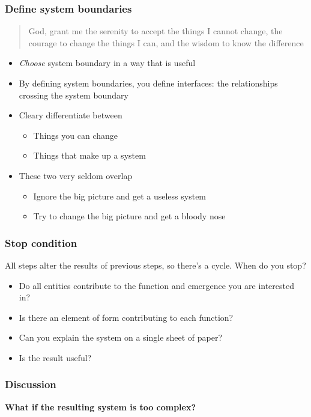 \documentclass[10pt, compress]{beamer}
\begin{document}
\begin{frame}[fragile]
	
	\frametitle{Define system boundaries}

\begin{quote}
God, grant me the serenity to accept the things I cannot change, the courage to change the things I can, and the wisdom to know the difference
\end{quote}
	
	\begin{itemize}
		\item \emph{Choose} system boundary in a way that is useful
		\item By defining system boundaries, you define interfaces: the relationships crossing the system boundary
		\item Cleary differentiate between
		\begin{itemize}
			\item Things you can change
			\item Things that make up a system
		\end{itemize}
		\item These two very seldom overlap
		\begin{itemize}
			\item Ignore the big picture and get a useless system
			\item Try to change the big picture and get a bloody nose
		\end{itemize}
		
	\end{itemize}

\end{frame}

\begin{frame}[fragile]
	\frametitle{Stop condition}
	
	All steps alter the results of previous steps, so there's a cycle. When do you stop?
	\begin{itemize}
		\item Do all entities contribute to the function and emergence you are interested in?
		\item Is there an element of form contributing to each function?
		\item Can you explain the system on a single sheet of paper?
		\item Is the result useful?
	\end{itemize}
\end{frame}

\begin{frame}[fragile]
  \frametitle{Discussion}
		\begin{center}
			\textbf{What if the resulting system is too complex?}
		\end{center}
\end{frame}
\end{document}
